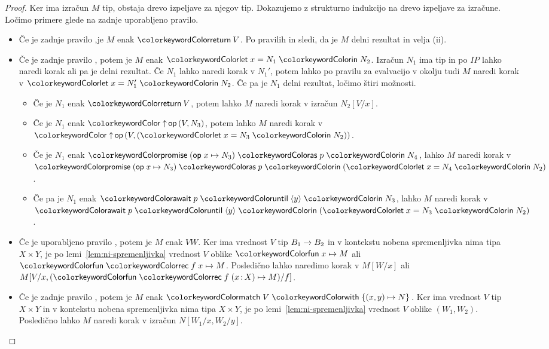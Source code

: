 \begin{proof}
	Ker ima izračun $M$ tip, obstaja drevo izpeljave za njegov tip.
	Dokazujemo z strukturno indukcijo na drevo izpeljave za izračune. 
	Ločimo primere glede na zadnje uporabljeno pravilo.
	
	\begin{itemize}
		\item Če je zadnje pravilo ,je $M$ enak $\tmreturn{V}$. 
		Po pravilih  in  sledi, da je $M$ delni rezultat in velja (ii).
		
		\item Če je zadnje pravilo , potem je $M$ enak $\tmlet{x}{N_1}{N_2}$.
		Izračun $N_1$ ima tip in po $IP$ lahko naredi korak ali pa je delni rezultat. Če $N_1$ lahko naredi korak v $N_1'$, potem lahko po pravilu za evalvacijo v okolju tudi $M$ naredi korak v $\tmlet{x}{N_1'}{N_2}$.
		Če pa je $N_1$ delni rezultat, ločimo štiri možnosti. 
		\begin{itemize}
			\item Če je $N_1$ enak $\tmreturn{V}$, potem lahko $M$ naredi korak v izračun $N_2[V/x]$.
			\item Če je $N_1$ enak $\tmopout{op}{V}{N_3}$, potem lahko $M$ naredi korak v $\tmopout{op}{V}{(\tmlet{x}{N_3}{N_2})}$.
			\item Če je $N_1$ enak $\tmwith{op}{x}{N_3}{p}{N_4}$, lahko $M$ naredi korak v $\tmwith{op}{x}{N_3}{p}{(\tmlet{x}{N_4}{N_2})}$.
			\item Če pa je $N_1$ enak $\tmawait{p}{y}{N_3}$, lahko $M$ naredi korak v $\tmawait{p}{y}{(\tmlet{x}{N_3}{N_2})}$.
		\end{itemize}
	
		\item Če je uporabljeno pravilo , potem je $M$ enak $V W$. Ker ima vrednost $V$ tip $B_1 \to B_2$ in v kontekstu nobena spremenljivka nima tipa $X \times Y$, je po lemi~\ref{lem:ni-spremenljivka} vrednost $V$ oblike $\tmfunano{x}{M}$ ali $\tmfunrecano{f}{x}{M}$. Posledično lahko naredimo korak v $M[W/x]$ ali $M[V/x, (\tmfunrec{f}{x \of X}{M})/f]$.
		
		\item Če je zadnje pravilo , potem je $M$ enak $\tmmatch{V}{(x,y) \mapsto N}$. Ker ima vrednost $V$ tip $X \times Y$ in v kontekstu nobena spremenljivka nima tipa $X \times Y$, je po lemi~\ref{lem:ni-spremenljivka} vrednost $V$ oblike $(W_1,W_2)$. Posledično lahko $M$ naredi korak v izračun $N[W_1/x,W_2/y]$.
		

\end{itemize}
\end{proof}
